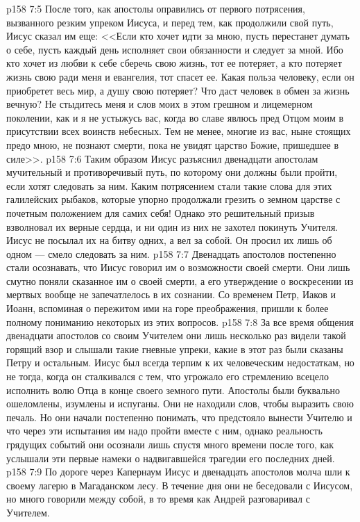 \vs p158 7:5 После того, как апостолы оправились от первого потрясения, вызванного резким упреком Иисуса, и перед тем, как продолжили свой путь, Иисус сказал им еще: <<Если кто хочет идти за мною, пусть перестанет думать о себе, пусть каждый день исполняет свои обязанности и следует за мной. Ибо кто хочет из любви к себе сберечь свою жизнь, тот ее потеряет, а кто потеряет жизнь свою ради меня и евангелия, тот спасет ее. Какая польза человеку, если он приобретет весь мир, а душу свою потеряет? Что даст человек в обмен за жизнь вечную? Не стыдитесь меня и слов моих в этом грешном и лицемерном поколении, как и я не устыжусь вас, когда во славе явлюсь пред Отцом моим в присутствии всех воинств небесных. Тем не менее, многие из вас, ныне стоящих предо мною, не познают смерти, пока не увидят царство Божие, пришедшее в силе>>.
\vs p158 7:6 Таким образом Иисус разъяснил двенадцати апостолам мучительный и противоречивый путь, по которому они должны были пройти, если хотят следовать за ним. Каким потрясением стали такие слова для этих галилейских рыбаков, которые упорно продолжали грезить о земном царстве с почетным положением для самих себя! Однако это решительный призыв взволновал их верные сердца, и ни один из них не захотел покинуть Учителя. Иисус не посылал их на битву одних, а вел за собой. Он просил их лишь об одном --- смело следовать за ним.
\vs p158 7:7 Двенадцать апостолов постепенно стали осознавать, что Иисус говорил им о возможности своей смерти. Они лишь смутно поняли сказанное им о своей смерти, а его утверждение о воскресении из мертвых вообще не запечатлелось в их сознании. Со временем Петр, Иаков и Иоанн, вспоминая о пережитом ими на горе преображения, пришли к более полному пониманию некоторых из этих вопросов.
\vs p158 7:8 За все время общения двенадцати апостолов со своим Учителем они лишь несколько раз видели такой горящий взор и слышали такие гневные упреки, какие в этот раз были сказаны Петру и остальным. Иисус был всегда терпим к их человеческим недостаткам, но не тогда, когда он сталкивался с тем, что угрожало его стремлению всецело исполнить волю Отца в конце своего земного пути. Апостолы были буквально ошеломлены, изумлены и испуганы. Они не находили слов, чтобы выразить свою печаль. Но они начали постепенно понимать, что предстояло вынести Учителю и что через эти испытания им надо пройти вместе с ним, однако реальность грядущих событий они осознали лишь спустя много времени после того, как услышали эти первые намеки о надвигавшейся трагедии его последних дней.
\vs p158 7:9 По дороге через Капернаум Иисус и двенадцать апостолов молча шли к своему лагерю в Магаданском лесу. В течение дня они не беседовали с Иисусом, но много говорили между собой, в то время как Андрей разговаривал с Учителем.
